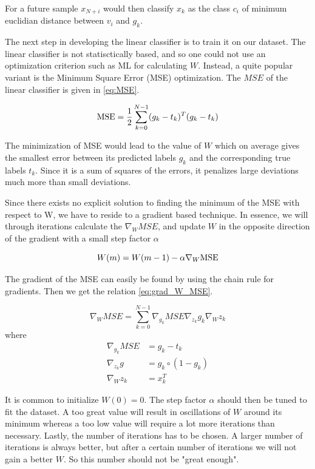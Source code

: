 \documentclass{article}
\begin{document}
For a future sample $x_{N+i}$ would then classify $x_k$ as the class $c_i$ of minimum euclidian
distance between $v_i$ and $g_k$.

The next step in developing the linear classifier is to train it on our dataset.
The linear classifier is not statisctically based, and so one could not use an optimization
criterion such as ML for calculating $W$. Instead, a quite popular variant is the Minimum Square
Error (MSE) optimization. The $MSE$ of the linear classifier is given in \eqref{eq:MSE}.

\begin{equation}
    \textnormal{MSE} = \frac{1}{2} \sum_{k=0}^{N-1} (g_k - t_k)^T(g_k - t_k) \label{eq:MSE}
\end{equation}

The minimization of MSE would lead to the value of $W$ which on average gives the smallest error
between its predicted labels $g_k$ and the corresponding true labels $t_k$. Since it is a sum of
squares of the errors, it penalizes large deviations much more than small deviations.

Since there exists no explicit solution to finding the minimum of the MSE with respect to W,
we have to reside to a gradient based technique. In essence, we will through iterations calculate
the $\nabla_W MSE$, and update $W$ in the opposite direction of the gradient with a
small step factor $\alpha$

\begin{equation}
    W(m) = W(m-1) - \alpha \nabla_W\textnormal{MSE} \label{eq:W_iteration}
\end{equation}

The gradient of the MSE can easily be found by using the chain rule for gradients. Then we get the
relation \eqref{eq:grad_W_MSE}.

\begin{equation}
    \nabla_WMSE = \sum_{k=0}^{N-1} \nabla_{g_k} MSE \nabla_{z_k} g_k \nabla_W z_k \label{eq:grad_W_MSE}
\end{equation}
where
\begin{align*}
    \nabla_{g_{k}} M S E &=g_{k}-t_{k} \\
    \nabla_{z_{k}} g &=g_{k} \circ\left(1-g_{k}\right) \\
    \nabla_{W} z_{k} &=x_{k}^{T}
\end{align*}

It is common to initialize $W(0) = 0$. The step factor $\alpha$ should then be tuned to fit the dataset.
A too great value will result in oscillations of $W$ around its minimum whereas a too low value will
require a lot more iterations than necessary. Lastly, the number of iterations has to be chosen.
A larger number of iterations is always better, but after a certain number of iterations we will
not gain a better $W$. So this number should not be "great enough".
\end{document}
